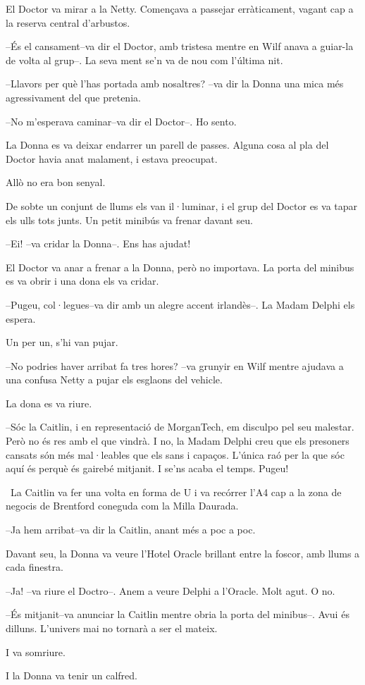 El Doctor va mirar a la Netty. Començava a passejar erràticament, vagant
cap a la reserva central d'arbustos.

--És el cansament--va dir el Doctor, amb tristesa mentre en Wilf anava a
guiar-la de volta al grup--. La seva ment se'n va de nou com l'última
nit.

--Llavors per què l'has portada amb nosaltres? --va dir la Donna una
mica més agressivament del que pretenia.

--No m'esperava caminar--va dir el Doctor--. Ho sento.

La Donna es va deixar endarrer un parell de passes. Alguna cosa al pla
del Doctor havia anat malament, i estava preocupat.

Allò no era bon senyal.

De sobte un conjunt de llums els van il·luminar, i el grup del Doctor es
va tapar els ulls tots junts. Un petit minibús va frenar davant seu.

--Ei! --va cridar la Donna--. Ens has ajudat!

El Doctor va anar a frenar a la Donna, però no importava. La porta del
minibus es va obrir i una dona els va cridar.

--Pugeu, col·legues--va dir amb un alegre accent irlandès--. La Madam
Delphi els espera.

Un per un, s'hi van pujar.

--No podries haver arribat fa tres hores? --va grunyir en Wilf mentre
ajudava a una confusa Netty a pujar els esglaons del vehicle.

La dona es va riure.

--Sóc la Caitlin, i en representació de MorganTech, em disculpo pel seu
malestar. Però no és res amb el que vindrà. I no, la Madam Delphi creu
que els presoners cansats són més mal·leables que els sans i capaços.
L'única raó per la que sóc aquí és perquè és gairebé mitjanit. I se'ns
acaba el temps. Pugeu!

~La Caitlin va fer una volta en forma de U i va recórrer l'A4 cap a la
zona de negocis de Brentford coneguda com la Milla Daurada.

--Ja hem arribat--va dir la Caitlin, anant més a poc a poc.

Davant seu, la Donna va veure l'Hotel Oracle brillant entre la foscor,
amb llums a cada finestra.

--Ja! --va riure el Doctro--. Anem a veure Delphi a l'Oracle. Molt agut.
O no.

--És mitjanit--va anunciar la Caitlin mentre obria la porta del
minibus--. Avui és dilluns. L'univers mai no tornarà a ser el mateix.

I va somriure.

I la Donna va tenir un calfred.